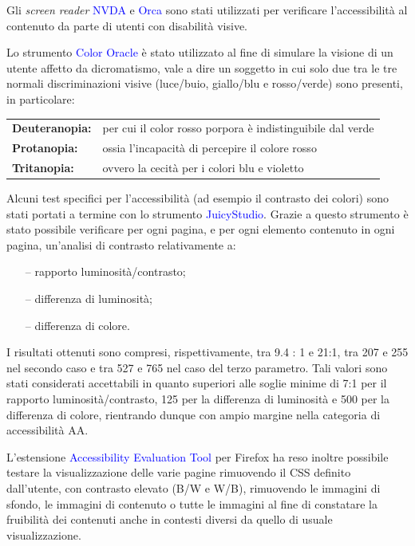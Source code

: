 \documentclass[10pt,a4paper,onecolumn]{article}
\newcommand{\inglese}[1]{\foreignlanguage{english}{\itshape{}#1}}
\newcommand{\progname}[1]{\textcolor{blue}{\textsf{#1}}}
\begin{document}
Gli \inglese{screen reader}  \progname{	NVDA} e  \progname{Orca} sono stati utilizzati per verificare l'accessibilità al contenuto da parte di utenti con disabilità visive.

Lo strumento \progname{Color Oracle} è stato utilizzato al fine di simulare la visione di un utente affetto da dicromatismo, vale a dire un soggetto in cui solo due tra le tre normali discriminazioni visive (luce/buio, giallo/blu e rosso/verde) sono presenti, in particolare:

\begin{tabular}{>{\sffamily\bfseries}lp{}}
  Deuteranopia: & per cui il color rosso porpora è indistinguibile dal verde\\
  Protanopia: & ossia l'incapacità di percepire il colore rosso\\
  Tritanopia: & ovvero la cecità per i colori blu e violetto\\
\end{tabular}

Alcuni test specifici per l'accessibilità (ad esempio il contrasto dei colori) sono stati portati a termine con lo strumento \progname{JuicyStudio}. Grazie a questo strumento è stato possibile verificare per ogni pagina, e per ogni elemento contenuto in ogni pagina, un'analisi di contrasto relativamente a:
\begin{itemize}[noitemsep,nolistsep]
  \item[--] rapporto luminosità/contrasto;
  \item[--] differenza di luminosità;
  \item[--] differenza di colore.
\end{itemize}

I risultati ottenuti sono compresi, rispettivamente, tra 9.4 : 1 e 21:1, tra 207 e 255 nel secondo caso e tra 527 e 765 nel caso del terzo parametro. Tali valori sono stati considerati accettabili in quanto superiori alle soglie minime di 7:1 per il rapporto luminosità/contrasto, 125 per la differenza di luminosità e 500 per la differenza di colore, rientrando dunque con ampio margine nella categoria di accessibilità AA\@.

L'estensione \progname{Accessibility Evaluation Tool} per Firefox ha reso inoltre possibile testare la visualizzazione delle varie pagine rimuovendo il CSS definito dall'utente, con contrasto elevato (B/W e W/B), rimuovendo le immagini di sfondo, le immagini di contenuto o tutte le immagini al fine di constatare la fruibilità dei contenuti anche in contesti diversi da quello di usuale visualizzazione.
\end{document}
